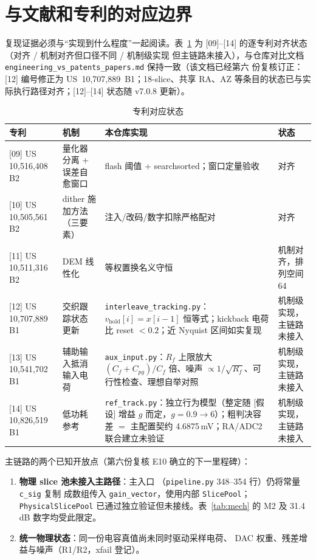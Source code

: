 \documentclass[11pt,a4paper,fontset=fandol]{ctexart}
\newcommand{\rec}[1]{\texttt{#1}}
\begin{document}
\FloatBarrier
\section{与文献和专利的对应边界}

复现证据必须与``实现到什么程度''一起阅读。表~\ref{tab:pat} 为
[09]--[14] 的逐专利对齐状态（对齐 / 机制对齐但口径不同 / 机制级实现
但主链路未接入），与仓库对比文档
\texttt{engineering\_vs\_patents\_papers.md} 保持一致（该文档已经第六
份复核订正：[12] 编号修正为 US~10,707,889~B1；18-slice、共享 RA、AZ
等条目的状态已与实际执行路径对齐；[12]--[14] 状态随 v7.0.8 更新）。

\begin{table}[h]\centering\small
\begin{tabular}{@{}p{3.6cm}p{5.6cm}p{3.6cm}p{1.9cm}@{}}
\toprule
\textbf{专利} & \textbf{机制} & \textbf{本仓库实现} & \textbf{状态}\\
\midrule
{}[09] US 10,516,408 B2 & 量化器分离 + 误差自愈窗口 & flash 阈值 + searchsorted；窗口定量验收 & \textcolor{okgreen}{对齐}\\
{}[10] US 10,505,561 B2 & dither 施加方法（三要素） & 注入/改码/数字扣除严格配对 & \textcolor{okgreen}{对齐}\\
{}[11] US 10,511,316 B2 & DEM 线性化 & 等权置换名义守恒 & \textcolor{warnamber}{机制对齐，排列空间 64}\\
{}[12] US 10,707,889 B1 & 交织跟踪状态更新 & \texttt{interleave\_tracking.py}：$v_{\mathrm{hold}}[i]=x[i{-}1]$ 恒等式；kickback 电荷比 reset $<0.2$；近 Nyquist 区间如实复现 & \textcolor{warnamber}{机制级实现，主链路未接入}\\
{}[13] US 10,541,702 B1 & 辅助输入抵消输入电荷 & \texttt{aux\_input.py}：$R_f$ 上限放大 $(C_f{+}C_{pg})/C_f$ 倍、噪声 $\propto 1/\sqrt{R_f}$、可行性检查、理想自举对照 & \textcolor{warnamber}{机制级实现，主链路未接入}\\
{}[14] US 10,826,519 B1 & 低功耗参考 & \texttt{ref\_track.py}：独立行为模型（整定随 [假设] 增益 $g$ 而定，$g{=}0.9\to$6）；粗判决容差 $=$ 主配置契约 4.6875\,mV；RA/ADC2 联合建立未验证 & \textcolor{warnamber}{机制级实现，主链路未接入}\\
\bottomrule
\end{tabular}
\caption{专利对应状态}\label{tab:pat}
\end{table}

主链路的两个已知开放点（第六份复核 E10 确立的下一里程碑）：
\begin{enumerate}[itemsep=1pt]
  \item \textbf{物理 slice 池未接入主路径}：主入口
        （\texttt{pipeline.py} 348--354 行）仍将常量 \rec{c\_sig} 复制
        成数组传入 \rec{gain\_vector}，使用内部 \texttt{SlicePool}；
        \texttt{PhysicalSlicePool} 已通过独立验证但未接线。表~\ref{tab:mech}
        的 M2 及 31.4\,dB 数字均受此限定。
  \item \textbf{统一物理状态}：同一份电容真值尚未同时驱动采样电荷、
        DAC 权重、残差增益与噪声（R1/R2，xfail 登记）。
\end{enumerate}
\end{document}
